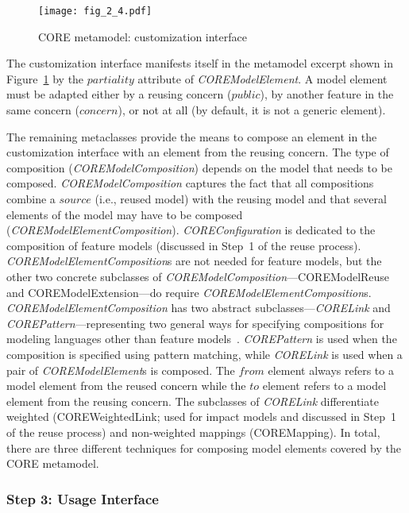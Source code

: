 \begin{figure}
	\centering
	\texttt{[image: fig\_2\_4.pdf]}
	\caption{CORE metamodel: customization interface}
	\label{fig:2.4}
\end{figure}

The customization interface manifests itself in the metamodel excerpt shown in Figure~\ref{fig:2.4} by the $partiality$ attribute of \textit{\cls COREModelElement}. A model element must be adapted either by a reusing concern ($public$), by another feature in the same concern ($concern$), or not at all (by default, it is not a generic element).

The remaining metaclasses provide the means to compose an element in the customization interface with an element from the reusing concern. The type of composition (\textit{\cls COREModelComposition}) depends on the model that needs to be composed. \textit{\cls COREModelComposition} captures the fact that all compositions combine a $source$ (i.e., reused model) with the reusing model and that several elements of the model may have to be composed (\textit{\cls COREModelElementComposition}). \textit{\cls COREConfiguration} is dedicated to the composition of feature models (discussed in Step~1 of the reuse process). \textit{\cls COREModelElementComposition}s are not needed for feature models, but the other two concrete subclasses of \textit{\cls COREModelComposition}---{\cls COREModelReuse} and {\cls COREModelExtension}---do require \textit{\cls COREModelElementComposition}s. \textit{\cls COREModelElementComposition} has two abstract subclasses---\textit{\cls CORELink} and \textit{\cls COREPattern}---representing two general ways for specifying compositions for modeling languages other than feature models~\cite{mussbacher2012assessing, alam2013revising}. \textit{\cls COREPattern} is used when the composition is specified using pattern matching, while \textit{\cls CORELink} is used when a pair of \textit{\cls COREModelElement}s is composed. The $from$ element always refers to a model element from the reused concern while the $to$ element refers to a model element from the reusing concern. The subclasses of \textit{\cls CORELink} differentiate weighted ({\cls COREWeightedLink}; used for impact models and discussed in Step~1 of the reuse process) and non-weighted mappings ({\cls COREMapping}). In total, there are three different techniques for composing model elements covered by the CORE metamodel.

\subsubsection{Step 3: Usage Interface}

